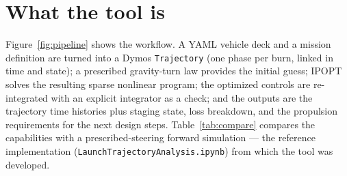 \documentclass[11pt,a4paper]{article}
\begin{document}
\section{What the tool is}
\label{sec:what}

Figure~\ref{fig:pipeline} shows the workflow. A YAML vehicle deck and a mission definition are turned into a
Dymos \texttt{Trajectory} (one phase per burn, linked in time and state); a prescribed gravity-turn law
provides the initial guess; IPOPT solves the resulting sparse nonlinear program; the optimized controls are
re-integrated with an explicit integrator as a check; and the outputs are the trajectory time histories plus
staging state, loss breakdown, and the propulsion requirements for the next design steps.
Table~\ref{tab:compare} compares the capabilities with a prescribed-steering forward simulation --- the
reference implementation (\texttt{LaunchTrajectoryAnalysis.ipynb}) from which the tool was developed.
\end{document}
